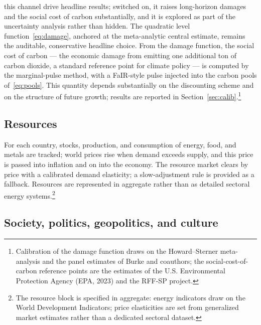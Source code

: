 \documentclass[a4paper,fleqn]{cas-sc}
\begin{document}
this channel drive headline results; switched on, it raises long-horizon damages and the social
cost of carbon substantially, and it is explored as part of the uncertainty analysis rather than
hidden. The quadratic level function~\eqref{eq:damage}, anchored at the meta-analytic central
estimate, remains the auditable, conservative headline choice. From the damage function, the
social cost of carbon --- the economic damage from emitting one additional ton of carbon dioxide,
a standard reference point for climate policy --- is computed by the marginal-pulse method, with a
FaIR-style pulse injected into the carbon pools of~\eqref{eq:pools}. This quantity depends
substantially on the discounting scheme and on the structure of future growth; results are
reported in Section~\ref{sec:calib}.\footnote{Calibration of the damage function draws on the Howard--Sterner
meta-analysis and the panel estimates of Burke and coauthors; the social-cost-of-carbon reference
points are the estimates of the U.S. Environmental Protection Agency (EPA, 2023) and the RFF-SP
project.}

\subsection{Resources}

For each country, stocks, production, and consumption of energy, food, and metals are tracked; world
prices rise when demand exceeds supply, and this price is passed into inflation and on into the
economy. The resource market clears by price with a calibrated demand elasticity; a slow-adjustment
rule is provided as a fallback. Resources are represented in aggregate rather than as detailed
sectoral energy systems.\footnote{The resource block is specified in aggregate: energy indicators
draw on the World Development Indicators; price elasticities are set from generalized market
estimates rather than a dedicated sectoral dataset.}

\subsection{Society, politics, geopolitics, and culture}
\end{document}
